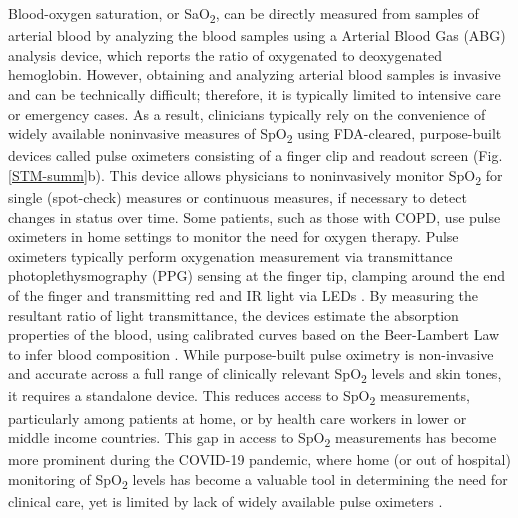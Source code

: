 \documentclass[12pt]{article}
\begin{document}
Blood-oxygen saturation, or SaO\textsubscript{2}, can be directly measured from samples of arterial blood by analyzing the blood samples using a
Arterial Blood Gas (ABG) analysis device, 
which reports the ratio of oxygenated to deoxygenated hemoglobin. 
However, obtaining and analyzing arterial blood samples is invasive and can be technically difficult; therefore, it is typically limited to intensive care or emergency cases.  As a result, clinicians typically rely on the convenience of widely available noninvasive measures of SpO\textsubscript{2} using FDA-cleared, purpose-built devices called pulse oximeters consisting of a finger clip and readout screen (Fig. \ref{STM-summ}b). This device allows physicians to noninvasively monitor SpO\textsubscript{2} for single (spot-check) measures or continuous measures, if necessary to detect changes in status over time.  Some patients, such as those with COPD, use pulse oximeters in home settings to monitor the need for oxygen therapy.
Pulse oximeters typically perform oxygenation measurement via transmittance photoplethysmography (PPG) sensing at the finger tip, clamping around the end of the finger and transmitting red and IR light via LEDs \cite{welch1990pulse}. By measuring the resultant ratio of light transmittance, the devices estimate the absorption properties of the blood, using calibrated curves based on the Beer-Lambert Law to infer blood composition \cite{bui2020smartphone}.  While purpose-built pulse oximetry is non-invasive and accurate across a full range of clinically relevant SpO\textsubscript{2} levels and skin tones, it requires a standalone device.
This reduces access to 
SpO\textsubscript{2} measurements, particularly among patients at home, or by health care workers in lower or middle income countries.
This gap in access to SpO\textsubscript{2} measurements has become more prominent during the COVID-19 pandemic, where home (or out of hospital) monitoring of SpO\textsubscript{2} levels has become a valuable tool in determining the need for clinical care, yet is limited by lack of widely available pulse oximeters
\cite{teo2020early}.
\end{document}

